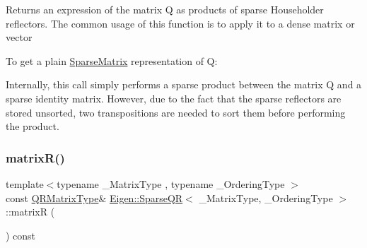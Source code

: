\begin{DoxyReturn}{Returns}
an expression of the matrix Q as products of sparse Householder reflectors. The common usage of this function is to apply it to a dense matrix or vector 
\begin{DoxyCode}{0}
\DoxyCodeLine{\textcolor{comment}{// Initialize B1}}
\end{DoxyCode}

\end{DoxyReturn}
To get a plain \mbox{\hyperlink{class_eigen_1_1_sparse_matrix}{Sparse\+Matrix}} representation of Q\+: 
\begin{DoxyCode}{0}
\end{DoxyCode}
 Internally, this call simply performs a sparse product between the matrix Q and a sparse identity matrix. However, due to the fact that the sparse reflectors are stored unsorted, two transpositions are needed to sort them before performing the product. \mbox{\label{class_eigen_1_1_sparse_q_r_a564524ff13b2b6dd1e76127404f7b920}} 
\subsubsection{\texorpdfstring{matrixR()}{matrixR()}}
{\footnotesize\ttfamily template$<$typename \+\_\+\+Matrix\+Type , typename \+\_\+\+Ordering\+Type $>$ \\
const \mbox{\hyperlink{class_eigen_1_1_sparse_matrix}{Q\+R\+Matrix\+Type}}\& \mbox{\hyperlink{class_eigen_1_1_sparse_q_r}{Eigen\+::\+Sparse\+QR}}$<$ \+\_\+\+Matrix\+Type, \+\_\+\+Ordering\+Type $>$\+::matrixR (\begin{DoxyParamCaption}{ }\end{DoxyParamCaption}) const\hspace{0.3cm}{\ttfamily [inline]}}

